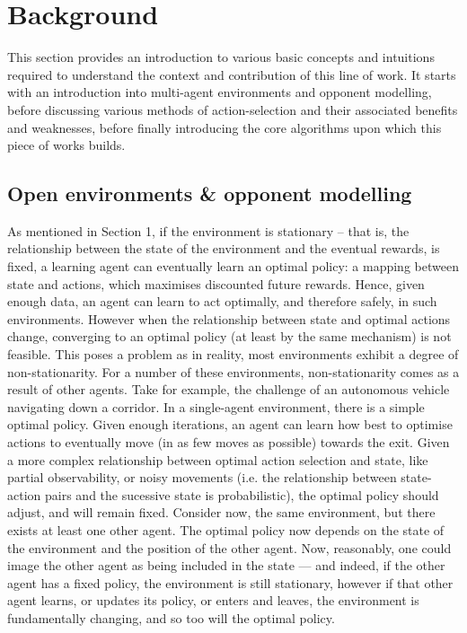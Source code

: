 \section{Background}\label{Background}
This section provides an introduction to various basic concepts and intuitions required to understand the context and contribution of this line of work. It starts with an introduction into multi-agent environments and opponent modelling, before discussing various methods of action-selection and their associated benefits and weaknesses, before finally introducing the core algorithms upon which this piece of works builds. 

\subsection{Open environments \& opponent modelling}
As mentioned in Section 1, if the environment is stationary -- that is, the relationship between the state of the environment and the eventual rewards, is fixed, a learning agent can eventually learn an optimal policy: a mapping between state and actions, which maximises discounted future rewards. 
Hence, given enough data, an agent can learn to act optimally, and therefore safely, in such environments. However when the relationship between state and optimal actions change, converging to an optimal policy (at least by the same mechanism) is not feasible. This poses a problem as in reality, most environments exhibit a degree of non-stationarity. For a number of these environments, non-stationarity comes as a result of other agents. Take for example, the challenge of an autonomous vehicle navigating down a corridor. 
\newline \newline
In a single-agent environment, there is a simple optimal policy. Given enough iterations, an agent can learn how best to optimise actions to eventually move (in as few moves as possible) towards the exit. 
\newline \newline
Given a more complex relationship between optimal action selection and state, like partial observability, or noisy movements (i.e. the relationship between state-action pairs and the sucessive state is probabilistic), the optimal policy should adjust, and will remain fixed. 
\newline \newline
Consider now, the same environment, but there exists at least one other agent. The optimal policy now depends on the state of the environment and the position of the other agent. Now, reasonably, one could image the other agent as being included in the state --- and indeed, if the other agent has a fixed policy, the environment is still stationary, however if that other agent learns, or updates its policy, or enters and leaves, the environment is fundamentally changing, and so too will the optimal policy.

